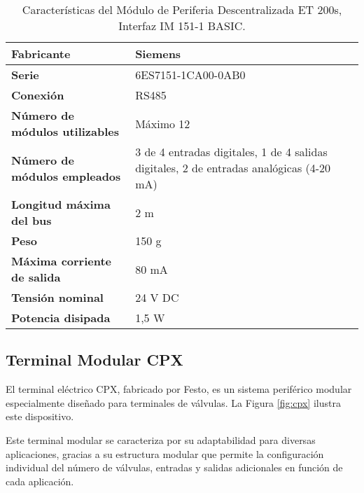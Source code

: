 \begin{table}[H]
    \centering
    \caption{Características del Módulo de Periferia Descentralizada ET 200s, Interfaz IM 151-1 BASIC.}
    \label{table:modulo_et_200}
    \begin{tabular}{| L{6cm} | L{6cm} |}
        \hline
        \textbf{Fabricante}                    & Siemens                           \\
        \hline
        \textbf{Serie}                         & 6ES7151-1CA00-0AB0                \\
        \hline
        \textbf{Conexión}                      & RS485                             \\
        \hline
        \textbf{Número de módulos utilizables} & Máximo 12                         \\
        \hline
        \textbf{Número de módulos empleados}   & 3 de 4 entradas digitales, 1 de 4
        salidas digitales, 2 de entradas
        analógicas (4-20 mA)                                                       \\
        \hline
        \textbf{Longitud máxima del bus}       & 2 m                               \\
        \hline
        \textbf{Peso}                          & 150 g                             \\
        \hline
        \textbf{Máxima corriente de salida}    & 80 mA                             \\
        \hline
        \textbf{Tensión nominal}               & 24 V DC                           \\
        \hline
        \textbf{Potencia disipada}             & 1,5 W                             \\
        \hline
    \end{tabular}
\end{table}

\subsection{Terminal Modular CPX} \label{sec:cpx}

El terminal eléctrico CPX, fabricado por Festo, es un sistema periférico modular especialmente diseñado para terminales de válvulas. La Figura \ref{fig:cpx} ilustra este dispositivo.


Este terminal modular se caracteriza por su adaptabilidad para diversas aplicaciones, gracias a su estructura modular que permite la configuración individual del número de válvulas, entradas y salidas adicionales en función de cada aplicación.

